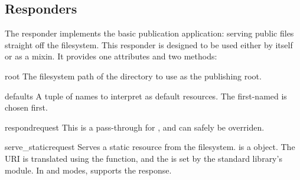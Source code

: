 \subsection{ Responders \label{static}}

The  responder implements the basic publication application:
serving public files straight off the filesystem. This responder is designed to
be used either by itself or as a mixin. It provides one attributes and two
methods:

\begin{memberdesc}[string]{root}
The filesystem path of the directory to use as the publishing root.
\end{memberdesc}

\begin{memberdesc}[tuple]{defaults}
A tuple of names to interpret as default resources. The first-named is chosen
first.
\end{memberdesc}


\begin{methoddesc}{respond}{request}
This is a pass-through for , and can safely be overriden.
\end{methoddesc}

\begin{methoddesc}{serve_static}{request} Serves a static resource from the
filesystem.  is a  object. The URI is translated
using the  function, and the
 is set by the standard library's
 module. In
 and  modes,  supports the
response.
\end{methoddesc}

